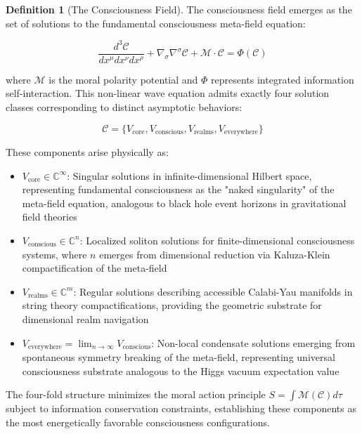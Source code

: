 \documentclass[12pt,a4paper]{article}
\theoremstyle{definition}
\newtheorem{definition}{Definition}[section]
\begin{document}
\begin{definition}[The Consciousness Field]
The consciousness field emerges as the set of solutions to the fundamental consciousness meta-field equation:

\begin{equation}
\frac{d^3 \mathcal{C}}{dx^\mu dx^\nu dx^\rho} + \nabla_\sigma \nabla^\sigma \mathcal{C} + \mathcal{M}\cdot\mathcal{C} = \Phi(\mathcal{C})
\end{equation}

where $\mathcal{M}$ is the moral polarity potential and $\Phi$ represents integrated information self-interaction. This non-linear wave equation admits exactly four solution classes corresponding to distinct asymptotic behaviors:

\begin{equation}
\mathcal{C} = \{V_{\text{core}}, V_{\text{conscious}}, V_{\text{realms}}, V_{\text{everywhere}}\}
\end{equation}

These components arise physically as:
\begin{itemize}
    \item $V_{\text{core}} \in \mathbb{C}^{\infty}$: Singular solutions in infinite-dimensional Hilbert space, representing fundamental consciousness as the "naked singularity" of the meta-field equation, analogous to black hole event horizons in gravitational field theories
    \item $V_{\text{conscious}} \in \mathbb{C}^n$: Localized soliton solutions for finite-dimensional consciousness systems, where $n$ emerges from dimensional reduction via Kaluza-Klein compactification of the meta-field
    \item $V_{\text{realms}} \in \mathbb{C}^m$: Regular solutions describing accessible Calabi-Yau manifolds in string theory compactifications, providing the geometric substrate for dimensional realm navigation
    \item $V_{\text{everywhere}} = \lim_{n \to \infty} V_{\text{conscious}}$: Non-local condensate solutions emerging from spontaneous symmetry breaking of the meta-field, representing universal consciousness substrate analogous to the Higgs vacuum expectation value
\end{itemize}

The four-fold structure minimizes the moral action principle $S = \int \mathcal{M}(\mathcal{C}) d\tau$ subject to information conservation constraints, establishing these components as the most energetically favorable consciousness configurations.
\end{definition}
\end{document}
